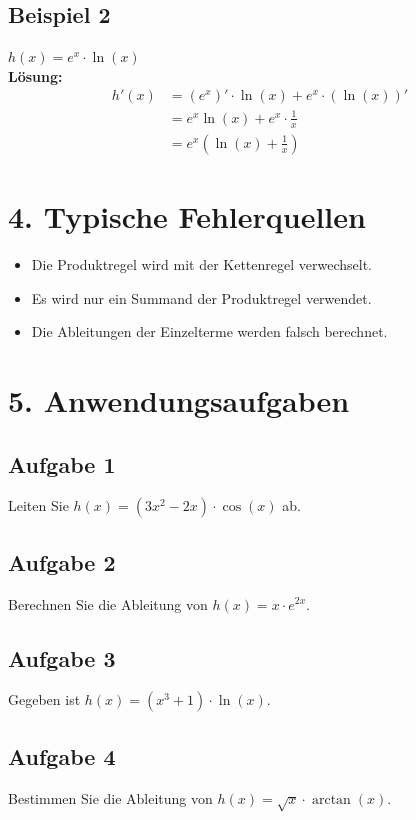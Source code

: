 \subsection*{Beispiel 2}
$h(x) = e^x \cdot \ln(x)$
\\
\textbf{Lösung:}
\begin{align*}
    h'(x) &= (e^x)' \cdot \ln(x) + e^x \cdot (\ln(x))' \\
    &= e^x \ln(x) + e^x \cdot \frac{1}{x} \\
    &= e^x \left( \ln(x) + \frac{1}{x} \right)
\end{align*}

\section*{4. Typische Fehlerquellen}
\begin{itemize}
    \item Die Produktregel wird mit der Kettenregel verwechselt.
    \item Es wird nur ein Summand der Produktregel verwendet.
    \item Die Ableitungen der Einzelterme werden falsch berechnet.
\end{itemize}

\section*{5. Anwendungsaufgaben}
\subsection*{Aufgabe 1}
Leiten Sie $h(x) = (3x^2 - 2x) \cdot \cos(x)$ ab.

\subsection*{Aufgabe 2}
Berechnen Sie die Ableitung von $h(x) = x \cdot e^{2x}$.

\subsection*{Aufgabe 3}
Gegeben ist $h(x) = (x^3 + 1) \cdot \ln(x)$.

\subsection*{Aufgabe 4}
Bestimmen Sie die Ableitung von $h(x) = \sqrt{x} \cdot \arctan(x)$.

